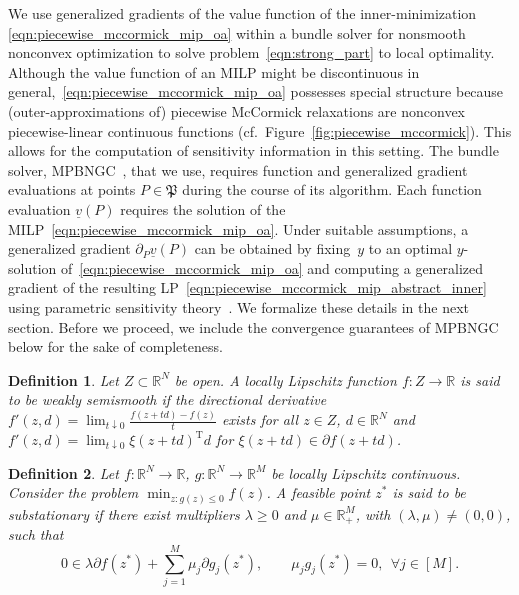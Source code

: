 \documentclass{article}
\newcommand{\pmc}{piecewise McCormick}
\newcommand{\tr}[1]{\ensuremath{{#1}^\text{T}}}
\newcommand{\R}{\mathbb{R}}
\newtheorem{definition}{Definition}
\begin{document}
We use generalized gradients of the value function of the inner-minimization \eqref{eqn:piecewise_mccormick_mip_oa} within a bundle solver for nonsmooth nonconvex optimization to solve problem~\eqref{eqn:strong_part} to local optimality.
Although the value function of an MILP might be discontinuous in general,~\eqref{eqn:piecewise_mccormick_mip_oa} possesses special structure because (outer-approximations of) {\pmc} relaxations are nonconvex piecewise-linear continuous functions (cf.\ Figure~\ref{fig:piecewise_mccormick}). This allows for the computation of sensitivity information in this setting. The bundle solver, MPBNGC~\cite{makela2003multiobjective}, that we use, requires function and generalized gradient evaluations at points $P \in \mathfrak{P}$ during the course of its algorithm.
Each function evaluation $\underline{v}(P)$ requires the solution of the MILP~\eqref{eqn:piecewise_mccormick_mip_oa}.
Under suitable assumptions, a generalized gradient $\partial_P \underline{v}(P)$ can be obtained by fixing~$y$ to an optimal $y$-solution of~\eqref{eqn:piecewise_mccormick_mip_oa} and computing a generalized gradient of the resulting LP~\eqref{eqn:piecewise_mccormick_mip_abstract_inner} using parametric sensitivity theory~\cite{de2021generalized}.
We formalize these details in the next section.
Before we proceed, we include the convergence guarantees of MPBNGC~\cite{makela2003multiobjective} below for the sake of completeness.




\begin{definition}
Let $Z \subset \mathbb{R}^N$ be open.
A locally Lipschitz function $f: Z \to \mathbb{R}$ is said to be weakly semismooth if the directional derivative
$f'(z,d) = \lim_{t \downarrow 0} \frac{f(z+td) - f(z)}{t}$
exists for all $z \in Z$, $d \in \R^N$ and $f'(z,d) = \lim_{t \downarrow 0} \tr{\xi(z+td)} d$ for $\xi(z+td) \in \partial f(z+td)$.
\end{definition}

\begin{definition}
Let $f: \R^N \to \R$, $g : \R^N \to \R^M$ be locally Lipschitz continuous.
Consider the problem $\min_{z: g(z) \leq 0} f(z)$.
A feasible point $z^*$ is said to be substationary if there exist multipliers $\lambda \geq 0$ and $\mu \in \mathbb{R}^M_+$, with $(\lambda, \mu) \neq (0, 0)$, such that
\[
0 \in \lambda \partial f(z^*) + \sum_{j=1}^{M} \mu_j \partial g_j(z^*), \qquad \mu_j g_j(z^*) = 0, \:\: \forall j \in [M].
\]
\end{definition}
\end{document}
